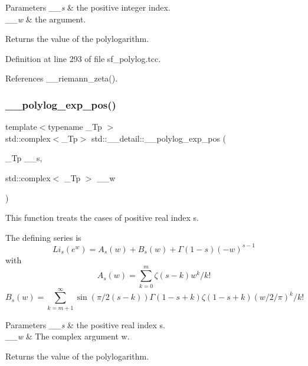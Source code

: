 \begin{DoxyParams}{Parameters}
{\em \+\_\+\+\_\+s} & the positive integer index. \\
\hline
{\em \+\_\+\+\_\+w} & the argument. \\
\hline
\end{DoxyParams}
\begin{DoxyReturn}{Returns}
the value of the polylogarithm. 
\end{DoxyReturn}


Definition at line 293 of file sf\+\_\+polylog.\+tcc.



References \+\_\+\+\_\+riemann\+\_\+zeta().

\mbox{\label{namespacestd_1_1____detail_a56b0f5bc6f4955469fd5f83105cbd466}} 
\subsubsection{\texorpdfstring{\+\_\+\+\_\+polylog\+\_\+exp\+\_\+pos()}{\_\_polylog\_exp\_pos()}\hspace{0.1cm}{\footnotesize\ttfamily [3/3]}}
{\footnotesize\ttfamily template$<$typename \+\_\+\+Tp $>$ \\
std\+::complex$<$\+\_\+\+Tp$>$ std\+::\+\_\+\+\_\+detail\+::\+\_\+\+\_\+polylog\+\_\+exp\+\_\+pos (\begin{DoxyParamCaption}\item[{\+\_\+\+Tp}]{\+\_\+\+\_\+s,  }\item[{std\+::complex$<$ \+\_\+\+Tp $>$}]{\+\_\+\+\_\+w }\end{DoxyParamCaption})}

This function treats the cases of positive real index s.

The defining series is \[ Li_s(e^w) = A_s(w) + B_s(w) + \Gamma(1-s)(-w)^{s-1} \] with \[ A_s(w) = \sum_{k=0}^{m} \zeta(s-k)w^k/k! \] \[ B_s(w) = \sum_{k=m+1}^{\infty} \sin(\pi/2(s-k)) \Gamma(1-s+k)\zeta(1-s+k) (w/2/\pi)^k/k! \]


\begin{DoxyParams}{Parameters}
{\em \+\_\+\+\_\+s} & the positive real index s. \\
\hline
{\em \+\_\+\+\_\+w} & The complex argument w. \\
\hline
\end{DoxyParams}
\begin{DoxyReturn}{Returns}
the value of the polylogarithm. 
\end{DoxyReturn}



